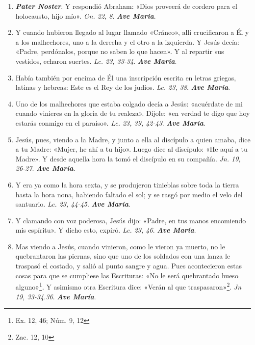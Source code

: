 \documentclass[../../devocionario.tex]{subfiles}
\begin{document}
    \begin{enumerate}
    
        \item \textbf{\emph{Pater Noster}}. Y respondió Abraham: «Dios proveerá de cordero para el holocausto, hijo mío». 
            \emph{Gn. 22, 8}. \textbf{\emph{Ave María}}.

        \item Y cuando hubieron llegado al lugar llamado «Cráneo», allí crucificaron a Él y a los malhechores, 
            uno a la derecha y el otro a la izquierda. Y Jesús decía: «Padre, perdónalos, porque no saben lo que hacen». 
            Y al repartir sus vestidos, echaron suertes. \emph{Lc. 23, 33-34}. \textbf{\emph{Ave María}}.

        \item Había también por encima de Él una inscripción escrita en letras griegas, latinas y hebreas: 
            Este es el Rey de los judios. \emph{Lc. 23, 38}. \textbf{\emph{Ave María}}.

        \item Uno de los malhechores que estaba colgado decía a Jesús: «acuérdate de mi cuando vinieres en la gloria de tu realeza». 
            Díjole: «en verdad te digo que hoy estarás conmigo en el paraíso». \emph{Lc. 23, 39, 42-43}. \textbf{\emph{Ave María}}.

        \item Jesús, pues, viendo a la Madre, y junto a ella al discípulo a quien amaba, dice a tu Madre: 
            «Mujer, he ahí a tu hijo». Luego dice al discípulo: «He aquí a tu Madre». 
            Y desde aquella hora la tomó el discípulo en su compañía. \emph{Jn. 19, 26-27}. \textbf{\emph{Ave María}}.

        \item Y era ya como la hora sexta, y se produjeron tinieblas sobre toda la tierra hasta la hora nona, 
            habiendo faltado el sol; y se rasgó por medio el velo del santuario. \emph{Lc. 23, 44-45}. \textbf{\emph{Ave María}}.

        \item Y clamando con voz poderosa, Jesús dijo: «Padre, en tus manos encomiendo mis espíritu». Y dicho esto, expiró. 
            \emph{Lc. 23, 46}. \textbf{\emph{Ave María}}.

        \item Mas viendo a Jesús, cuando vinieron, como le vieron ya muerto, no le quebrantaron las piernas, sino que uno de los soldados 
            con una lanza le traspasó el costado, y salió al punto sangre y agua. Pues acontecieron estas cosas para que se cumpliese las
            Escrituras: «No le será quebrantado hueso alguno»\footnote{Ex. 12, 46; Núm. 9, 12}. Y asimismo otra Escritura dice: «Verán al que
            traspasaron»\footnote{Zac. 12, 10}. \emph{Jn 19, 33-34.36}. \textbf{\emph{Ave María}}.


\end{enumerate}
\end{document}
